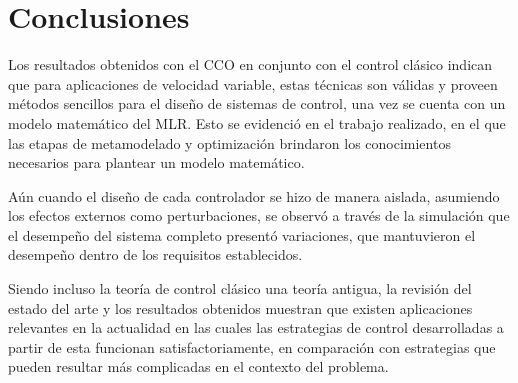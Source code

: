 \section{Conclusiones}
Los resultados obtenidos con el CCO en conjunto con el control clásico indican que para aplicaciones de velocidad variable, estas técnicas son válidas y proveen métodos sencillos para el diseño de sistemas de control, una vez se cuenta con un modelo matemático del MLR. Esto se evidenció en el trabajo realizado, en el que las etapas de metamodelado y optimización brindaron los conocimientos necesarios para plantear un modelo matemático.

Aún cuando el diseño de cada controlador se hizo de manera aislada, asumiendo los efectos externos como perturbaciones, se observó a través de la simulación que el desempeño del sistema completo presentó variaciones, que mantuvieron el desempeño dentro de los requisitos establecidos.

Siendo incluso la teoría de control clásico una teoría antigua, la revisión del estado del arte y los resultados obtenidos muestran que existen aplicaciones relevantes en la actualidad en las cuales las estrategias de control desarrolladas a partir de esta funcionan satisfactoriamente, en comparación con estrategias que pueden resultar más complicadas en el contexto del problema.


